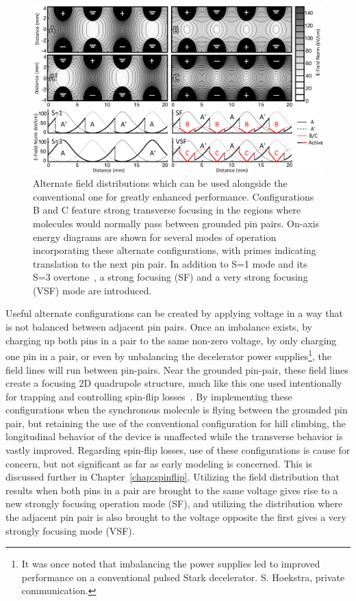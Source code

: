 \begin{figure}[t!]
\includegraphics[width=\linewidth]{Slowing/pinpairformal.png}%
\caption[Definition and Explanation of Alternate Field Distributions]{\label{fig:chargecartoon}
Alternate field distributions which can be used alongside the conventional one for greatly enhanced performance. Configurations B and C feature strong transverse focusing in the regions where molecules would normally pass between grounded pin pairs. On-axis energy diagrams are shown for several modes of operation incorporating these alternate configurations, with primes indicating translation to the next pin pair. In addition to S=1 mode and its S=3 overtone~\cite{VanDeMeerakker2005a}, a strong focusing (SF) and a very strong focusing (VSF) mode are introduced.
}
\end{figure}


Useful alternate configurations can be created by applying voltage in a way that is not balanced between adjacent pin pairs. 
Once an imbalance exists, by charging up both pins in a pair to the same non-zero voltage, by only charging one pin in a pair, or even by unbalancing the decelerator power supplies\footnote{It was once noted that imbalancing the power supplies led to improved performance on a conventional pulsed Stark decelerator. S. Hoekstra, private communication.}, the field lines will run between pin-pairs. 
Near the grounded pin-pair, these field lines create a focusing 2D quadrupole structure, much like this one used intentionally for trapping and controlling spin-flip losses~\cite{Reens2017}. 
By implementing these configurations when the synchronous molecule is flying between the grounded pin pair, but retaining the use of the conventional configuration for hill climbing, the longitudinal behavior of the device is unaffected while the transverse behavior is vastly improved.
Regarding spin-flip losses, use of these configurations is cause for concern, but not significant as far as early modeling is concerned. This is discussed further in Chapter~\ref{chap:spinflip}.
Utilizing the field distribution that results when both pins in a pair are brought to the same voltage gives rise to a new strongly focusing operation mode (SF), and utilizing the distribution where the adjacent pin pair is also brought to the voltage opposite the first gives a very strongly focusing mode (VSF). 

